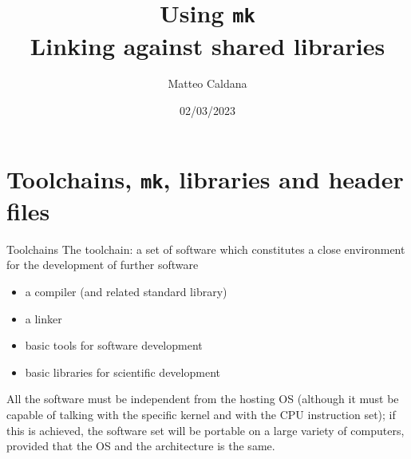 \documentclass[10pt,aspectratio=169]{beamer}
\begin{document}
\title{Using \texttt{mk}\\
  Linking against shared libraries}
\author{Matteo Caldana}
\date{02/03/2023}

\begin{frame}
  \maketitle
\end{frame}

\section{Toolchains, \texttt{mk}, libraries and header files}

\begin{frame}{Toolchains}
  The toolchain: a set of software which constitutes a close environment for the development of further software

  \begin{itemize}
  \item a compiler (and related standard library)
  \item a linker
  \item basic tools for software development
  \item basic libraries for scientific development
  \end{itemize}	

  All the software must be independent from the hosting OS 
  (although it must be capable of talking with the specific kernel and with the CPU instruction set); if this is achieved, the software set will be portable on a large variety of computers, provided that the OS and the architecture is the same.

\end{frame}
\end{document}
